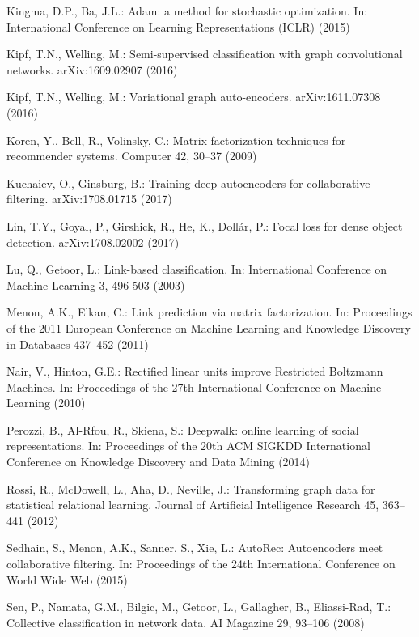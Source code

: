 \documentclass[letterpaper, conference]{IEEEtran}  %
\begin{document}
\begin{thebibliography}{99}
Kingma, D.P., Ba, J.L.:
Adam: a method for stochastic optimization.
In: International Conference on Learning Representations (ICLR) (2015)

Kipf, T.N., Welling, M.:
Semi-supervised classification with graph convolutional networks.
arXiv:1609.02907 (2016)

Kipf, T.N., Welling, M.:
Variational graph auto-encoders.
arXiv:1611.07308 (2016)

Koren, Y., Bell, R., Volinsky, C.:
Matrix factorization techniques for recommender systems.
Computer 42, 30--37 (2009)

Kuchaiev, O., Ginsburg, B.:
Training deep autoencoders for collaborative filtering.
arXiv:1708.01715 (2017)

Lin, T.Y., Goyal, P., Girshick, R., He, K., Doll{\'a}r, P.:
Focal loss for dense object detection.
arXiv:1708.02002 (2017)

Lu, Q., Getoor, L.:
Link-based classification.
In: International Conference on Machine Learning 3, 496-503 (2003)

Menon, A.K., Elkan, C.:
Link prediction via matrix factorization.
In: Proceedings of the 2011 European Conference on Machine Learning and Knowledge Discovery in Databases 437--452 (2011)

Nair, V., Hinton, G.E.:
Rectified linear units improve Restricted Boltzmann Machines.
In: Proceedings of the 27th International Conference on Machine Learning (2010)

Perozzi, B., Al-Rfou, R., Skiena, S.:
Deepwalk: online learning of social representations.
In: Proceedings of the 20th ACM SIGKDD International Conference on Knowledge Discovery and Data Mining (2014)

Rossi, R., McDowell, L., Aha, D., Neville, J.:
Transforming graph data for statistical relational learning.
Journal of Artificial Intelligence Research 45, 363--441 (2012)

Sedhain, S., Menon, A.K., Sanner, S., Xie, L.:
AutoRec: Autoencoders meet collaborative filtering.
In: Proceedings of the 24th International Conference on World Wide Web (2015)

Sen, P., Namata, G.M., Bilgic, M., Getoor, L., Gallagher, B., Eliassi-Rad, T.:
Collective classification in network data.
AI Magazine 29, 93--106 (2008)


\end{thebibliography}
\end{document}
